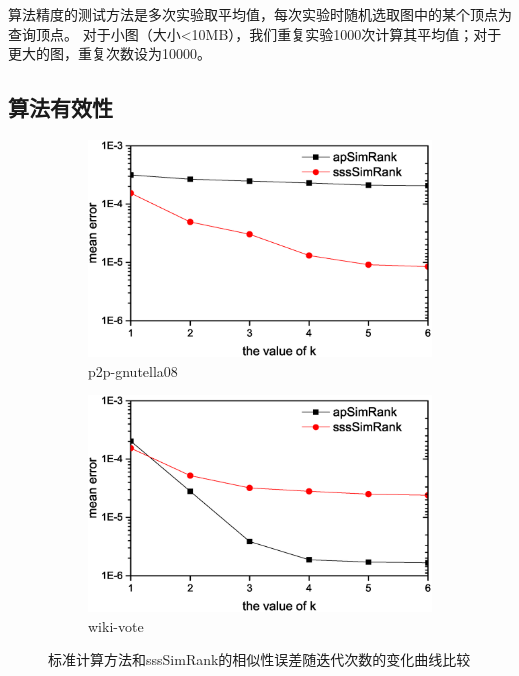 \documentclass[master]{njuthesis}
\begin{document}
算法精度的测试方法是多次实验取平均值，每次实验时随机选取图中的某个顶点为查询顶点。
对于小图（大小<10MB），我们重复实验1000次计算其平均值；对于更大的图，重复次数设为10000。
\subsection{算法有效性}
\begin{figure}[h]
\centering
\begin{subfigure}[b]{0.48\textwidth}
	\center
	\includegraphics[width=1\textwidth]{figure/accuracy1.eps}
	\caption{p2p-gnutella08}
	\label{fig:ch1:effec:one}
\end{subfigure}
\begin{subfigure}[b]{0.48\textwidth}
	\centering
	\includegraphics[width=1\textwidth]{figure/accuracy2.eps}
	\caption{wiki-vote}
	\label{fig:ch1:effec:two}
\end{subfigure}
\caption{标准计算方法和sssSimRank的相似性误差随迭代次数的变化曲线比较}
\label{fig:ch1:effect}
\end{figure}
\end{document}
